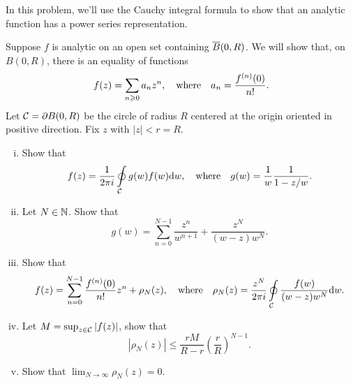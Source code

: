 \documentclass[12pt]{memoir}
\begin{document}
\begin{Ej}
    In this problem, we'll use the Cauchy integral formula to show that an analytic function has a power series representation.\par
    Suppose $f$ is analytic on an open set containing $\overline{B}(0,R)$. We will show that, on $B(0,R)$, there is an equality of functions
    $$f(z)=\sum_{n\geqslant 0}a_nz^n,\quad\text{where}\quad a_n=\frac{f^{(n)}(0)}{n!}.$$
    Let $\mathcal{C}=\partial B(0,R)$ be the circle of radius $R$ centered at the origin oriented in positive direction. Fix $z$ with $|z|<r=R$.
    \begin{enumerate}[i)]
        \itemsep=-0.4em
        \item Show that 
        $$f(z)=\frac{1}{2\pi i}\oint\limits_{\mathcal{C}} g(w)f(w)\dd w,\quad\text{where}\quad g(w)=\frac{1}{w}\frac{1}{1-z/w}.$$
        \item Let $N\in\mathbb{N}$. Show that 
        $$g(w)=\sum_{n=0}^{N-1}\frac{z^n}{w^{n+1}}+\frac{z^N}{(w-z)w^N}.$$
        \item Show that 
        $$f(z)=\sum_{n=0}^{N-1}\frac{f^{(n)}(0)}{n!}z^n+\rho_N(z),\quad\text{where}\quad\rho_N(z)=\frac{z^N}{2\pi i}\oint\limits_{\mathcal{C}}\frac{f(w)}{(w-z)w^N}\dd w.$$
        \item Let $M=\sup_{z\in\mathcal{C}}|f(z)|$, show that 
        $$|\rho_N(z)|\leq\frac{rM}{R-r}\left(\frac{r}{R}\right)^{N-1}.$$
        \item Show that $\lim_{N\to\infty}\rho_N(z)=0$.
    \end{enumerate}
\end{Ej}
\end{document}
